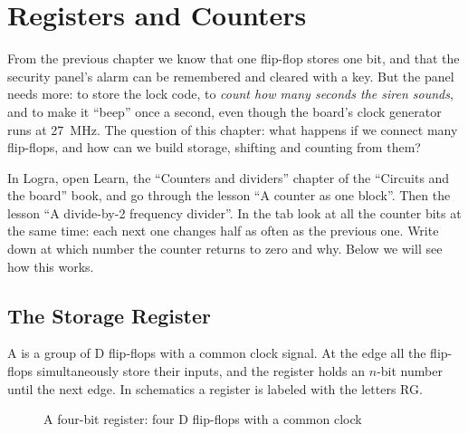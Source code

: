 \chapter{Registers and Counters}
\label{ch:regs}

From the previous chapter we know that one flip-flop stores one bit, and that
the security panel's alarm can be remembered and cleared with a key. But the
panel needs more: to store the lock code, to \emph{count how many seconds the
siren sounds}, and to make it ``beep'' once a second, even though the board's
clock generator runs at 27~MHz. The question of this chapter: what happens if
we connect many flip-flops, and how can we build storage, shifting and counting
from them?

\begin{buildbox}
In Logra, open Learn, the ``Counters and dividers'' chapter of the ``Circuits and
the board'' book, and go through the lesson ``A counter as one block''. Then the
lesson ``A divide-by-2 frequency divider''. In the  tab look at
all the counter bits at the same time: each next one changes half as often as the
previous one. Write down at which number the counter returns to zero and why.
Below we will see how this works.
\end{buildbox}

\newcommand{\dff}[3]{%
  \draw[thick, fill=green!8] (#2,#3) rectangle ++(1.2,1.4);
  \node[font=\sffamily\footnotesize] at (#2+0.22,#3+1.05) {D};
  \node[font=\sffamily\footnotesize] at (#2+0.98,#3+1.05) {Q};
  \draw[thick] (#2,#3+0.2) -- (#2+0.18,#3+0.35) -- (#2,#3+0.5);
  \coordinate (#1-d) at (#2,#3+1.05); \coordinate (#1-q) at (#2+1.2,#3+1.05);
  \coordinate (#1-c) at (#2,#3+0.35);}

\section{The Storage Register}

A  is a group of D flip-flops with a common clock signal. At the
edge all the flip-flops simultaneously store their inputs, and the register
holds an $n$-bit number until the next edge. In schematics a register is
labeled with the letters RG.

\begin{figure}[H]
\centering
{}
\caption{A four-bit register: four D flip-flops with a common clock}
\label{fig:reg}
\end{figure}

